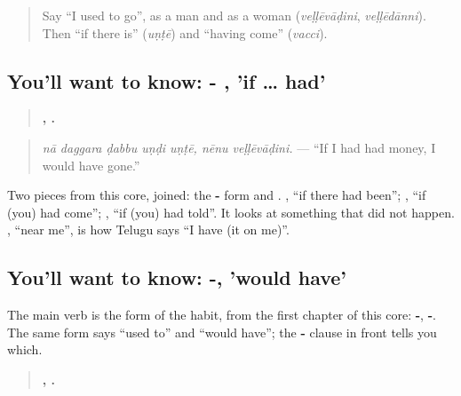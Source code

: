 \label{lesson:TE-C325-undi-unte}



\begin{quote}
Say \textquotedblleft{}I used to go\textquotedblright{}, as a man and as a woman (\emph{veḷḷēvāḍini}, \emph{veḷḷēdānni}). Then \textquotedblleft{}if there is\textquotedblright{} (\emph{uṇṭē}) and \textquotedblleft{}having come\textquotedblright{} (\emph{vacci}).
\end{quote}

\subsection*{You'll want to know: - , 'if … had'}
\begin{quote}
\textbf{    ,  .}
\end{quote}

\begin{quote}
\emph{nā daggara ḍabbu uṇḍi uṇṭē, nēnu veḷḷēvāḍini.} — \textquotedblleft{}If I had had money, I would have gone.\textquotedblright{}
\end{quote}

Two pieces from this core, joined: the \textbf{-} form and \textbf{}. \textbf{ }, \textquotedblleft{}if there had been\textquotedblright{}; \textbf{ }, \textquotedblleft{}if (you) had come\textquotedblright{}; \textbf{ }, \textquotedblleft{}if (you) had told\textquotedblright{}. It looks at something that did not happen. \textbf{ }, \textquotedblleft{}near me\textquotedblright{}, is how Telugu says \textquotedblleft{}I have (it on me)\textquotedblright{}.

\subsection*{You'll want to know: -, 'would have'}
The main verb is the form of the habit, from the first chapter of this core: \textbf{-}, \textbf{-}. The same form says \textquotedblleft{}used to\textquotedblright{} and \textquotedblleft{}would have\textquotedblright{}; the \textbf{- } clause in front tells you which.

\begin{quote}
\textbf{   ,  .}
\end{quote}

